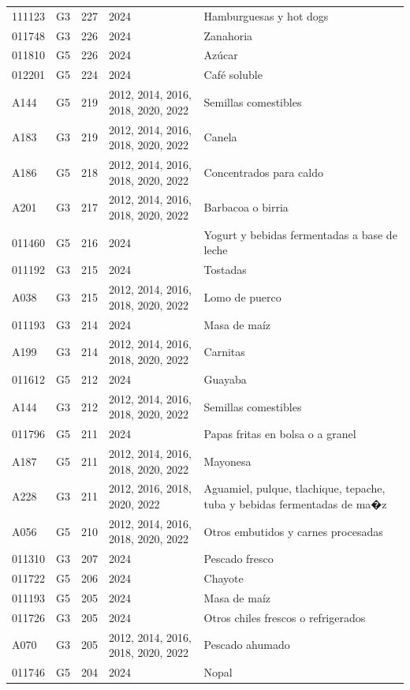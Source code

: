 \begin{table}[ht]
\begin{tabular}{llrll}
  111123 & G3 & 227 & 2024 & Hamburguesas y hot dogs \\ 
  011748 & G3 & 226 & 2024 & Zanahoria \\ 
  011810 & G5 & 226 & 2024 & Azúcar \\ 
  012201 & G5 & 224 & 2024 & Café soluble \\ 
  A144 & G5 & 219 & 2012, 2014, 2016, 2018, 2020, 2022 & Semillas comestibles \\ 
  A183 & G3 & 219 & 2012, 2014, 2016, 2018, 2020, 2022 & Canela \\ 
  A186 & G5 & 218 & 2012, 2014, 2016, 2018, 2020, 2022 & Concentrados para caldo \\ 
  A201 & G3 & 217 & 2012, 2014, 2016, 2018, 2020, 2022 & Barbacoa o birria \\ 
  011460 & G5 & 216 & 2024 & Yogurt y bebidas fermentadas a base de leche \\ 
  011192 & G3 & 215 & 2024 & Tostadas \\ 
  A038 & G3 & 215 & 2012, 2014, 2016, 2018, 2020, 2022 & Lomo de puerco \\ 
  011193 & G3 & 214 & 2024 & Masa de maíz \\ 
  A199 & G3 & 214 & 2012, 2014, 2016, 2018, 2020, 2022 & Carnitas \\ 
  011612 & G5 & 212 & 2024 & Guayaba \\ 
  A144 & G3 & 212 & 2012, 2014, 2016, 2018, 2020, 2022 & Semillas comestibles \\ 
  011796 & G5 & 211 & 2024 & Papas fritas en bolsa o a granel \\ 
  A187 & G5 & 211 & 2012, 2014, 2016, 2018, 2020, 2022 & Mayonesa \\ 
  A228 & G3 & 211 & 2012, 2016, 2018, 2020, 2022 & Aguamiel, pulque, tlachique, tepache, tuba y bebidas fermentadas de ma�z \\ 
  A056 & G5 & 210 & 2012, 2014, 2016, 2018, 2020, 2022 & Otros embutidos y carnes procesadas \\ 
  011310 & G3 & 207 & 2024 & Pescado fresco \\ 
  011722 & G5 & 206 & 2024 & Chayote \\ 
  011193 & G5 & 205 & 2024 & Masa de maíz \\ 
  011726 & G3 & 205 & 2024 & Otros chiles frescos o refrigerados \\ 
  A070 & G3 & 205 & 2012, 2014, 2016, 2018, 2020, 2022 & Pescado ahumado \\ 
  011746 & G5 & 204 & 2024 & Nopal \\ 

\end{tabular}
\end{table}
